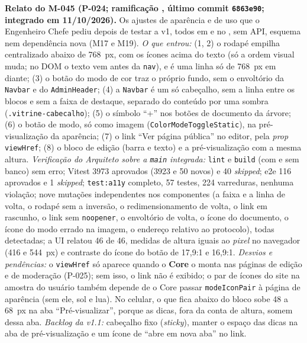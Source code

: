 \noindent{}\quad \textbf{Relato do M-045 (P-024; ramificação , último commit \texttt{6863e90}; integrado em 11/10/2026).} Os ajustes de aparência e de uso que o Engenheiro Chefe pediu depois de testar a v1, todos em  e no , sem API, esquema nem dependência nova (M17 e M19). \emph{O que entrou:} (1, 2) o rodapé empilha centralizado abaixo de 768~px, com os ícones acima do texto (só a ordem visual muda; no DOM o texto vem antes da \texttt{nav}), e é uma linha só de 768~px em diante; (3) o botão do modo de cor traz o próprio fundo, sem o envoltório da \texttt{Navbar} e do \texttt{AdminHeader}; (4) a \texttt{Navbar} é um só cabeçalho, sem a linha entre os blocos e sem a faixa de destaque, separado do conteúdo por uma sombra (\texttt{.vitrine-cabecalho}); (5) o símbolo ``+'' nos botões de documento da árvore; (6) o botão de modo, só como imagem (\texttt{ColorModeToggleStatic}), na pré-visualização da aparência; (7) o link ``Ver página pública'' no editor, pela \emph{prop} \texttt{viewHref}; (8) o bloco de edição (barra e texto) e a pré-visualização com a mesma altura. \emph{Verificação do Arquiteto sobre a \texttt{main} integrada:} \texttt{lint} e \texttt{build} (com e sem banco) sem erro; Vitest 3973 aprovados (3923 e 50 novos) e 40 \emph{skipped}; e2e 116 aprovados e 1 \emph{skipped}; \texttt{test:a11y} completo, 57 testes, 224 varreduras, nenhuma violação; nove mutações independentes nos componentes (a faixa e a linha de volta, o rodapé sem a inversão, o redimensionamento de volta, o link em rascunho, o link sem \texttt{noopener}, o envoltório de volta, o ícone do documento, o ícone do modo errado na imagem, o endereço relativo ao protocolo), todas detectadas; a UI relatou 46 de 46, medidas de altura iguais ao \emph{pixel} no navegador (416 e 544~px) e contraste do ícone do botão de 17,9:1 e 16,9:1. \emph{Desvios e pendências:} o \texttt{viewHref} só aparece quando o \textbf{Core} o monta nas páginas de edição e de moderação (P-025); sem isso, o link não é exibido; o par de ícones do site na amostra do usuário também depende de o Core passar \texttt{modeIconPair} à página de aparência (sem ele, sol e lua). No celular, o que fica abaixo do bloco sobe 48 a 68~px na aba ``Pré-visualizar'', porque as dicas, fora da conta de altura, somem dessa aba. \emph{Backlog da v1.1:} cabeçalho fixo (\emph{sticky}), manter o espaço das dicas na aba de pré-visualização e um ícone de ``abre em nova aba'' no link.

